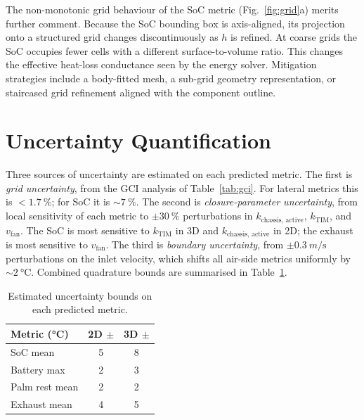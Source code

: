 \documentclass[10pt,twocolumn,letterpaper]{article}
\newcommand{\kchas}{k_{\mathrm{chassis,\,active}}}
\newcommand{\kTIM}{k_{\mathrm{TIM}}}
\newcommand{\vfan}{v_{\mathrm{fan}}}
\begin{document}
The non-monotonic grid behaviour of the SoC metric
(Fig.~\ref{fig:grid}a) merits further comment. Because the SoC
bounding box is axis-aligned, its projection onto a structured
grid changes discontinuously as $h$ is refined. At coarse grids
the SoC occupies fewer cells with a different surface-to-volume
ratio. This changes the effective heat-loss conductance seen by
the energy solver. Mitigation strategies include a body-fitted
mesh, a sub-grid geometry representation, or staircased grid
refinement aligned with the component outline.

\section{Uncertainty Quantification}
\label{sec:uq}

Three sources of uncertainty are estimated on each predicted
metric. The first is \emph{grid uncertainty}, from the GCI analysis
of Table~\ref{tab:gci}. For lateral metrics this is
$<\SI{1.7}{\percent}$; for SoC it is $\sim\SI{7}{\percent}$. The
second is \emph{closure-parameter uncertainty}, from local
sensitivity of each metric to $\pm\SI{30}{\percent}$ perturbations
in $\kchas$, $\kTIM$, and $\vfan$. The SoC is most sensitive to
$\kTIM$ in 3D and $\kchas$ in 2D; the exhaust is most sensitive to
$\vfan$. The third is \emph{boundary uncertainty}, from
$\pm\SI{0.3}{m\per\second}$ perturbations on the inlet velocity,
which shifts all air-side metrics uniformly by
$\sim\SI{2}{\celsius}$. Combined quadrature bounds are summarised
in Table~\ref{tab:uq}.

\begin{table}[!tbp]
  \centering
  \caption{Estimated uncertainty bounds on each predicted metric.}
  \label{tab:uq}
  \small
  \begin{tabular}{@{}lcc@{}}
    \toprule
    Metric (\si{\celsius}) & 2D $\pm$ & 3D $\pm$ \\
    \midrule
    SoC mean        & 5 & 8 \\
    Battery max     & 2 & 3 \\
    Palm rest mean  & 2 & 2 \\
    Exhaust mean    & 4 & 5 \\
    \bottomrule
  \end{tabular}
\end{table}
\end{document}
